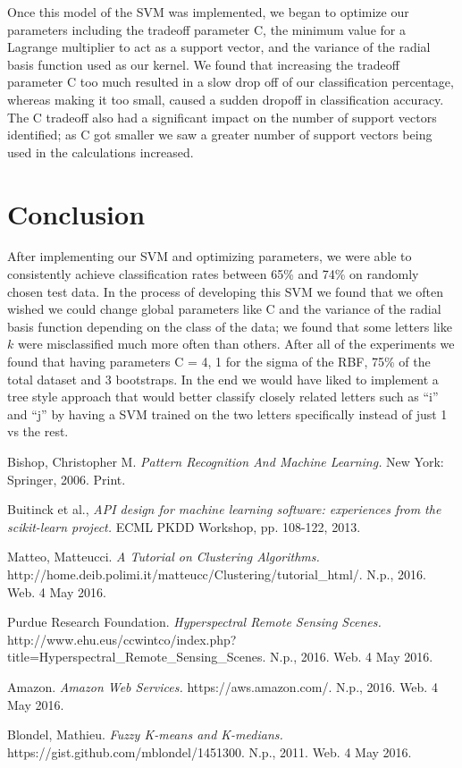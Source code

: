 \documentclass[journal]{IEEEtran}
\begin{document}
Once this model of the SVM was implemented, we began to optimize our parameters including the tradeoff parameter C, the minimum value for a Lagrange multiplier to act as a support vector, and the variance of the radial basis function used as our kernel. We found that increasing the tradeoff parameter C too much resulted in a slow drop off of our classification percentage, whereas making it too small, caused a sudden dropoff in classification accuracy. The C tradeoff also had a significant impact on the number of support vectors identified; as C got smaller we saw a greater number of support vectors being used in the calculations increased.\\

\section{Conclusion}
After implementing our SVM and optimizing parameters, we were able to consistently achieve classification rates between 65\% and 74\% on randomly chosen test data. In the process of developing this SVM we found that we often wished we could change global parameters like C and the variance of the radial basis function depending on the class of the data; we found that some letters like $k$ were misclassified much more often than others. After all of the experiments we found that having parameters C = 4, 1 for the sigma of the RBF, 75\% of the total dataset and 3 bootstraps. In the end we would have liked to implement a tree style approach that would better classify closely related letters such as “i” and “j” by having a SVM trained on the two letters specifically instead of just 1 vs the rest.


\ifCLASSOPTIONcaptionsoff
  \newpage
\fi

\begin{thebibliography}{1}

  Bishop, Christopher M. \emph{Pattern Recognition And Machine Learning.} New York: Springer, 2006. Print.

  Buitinck et al., \emph{API design for machine learning software: experiences from the scikit-learn project.} ECML PKDD Workshop, pp. 108-122, 2013.

  Matteo, Matteucci. \emph{A Tutorial on Clustering Algorithms.} http://home.deib.polimi.it/matteucc/Clustering/tutorial\_html/. N.p., 2016. Web. 4 May 2016.

  Purdue Research Foundation. \emph{Hyperspectral Remote Sensing Scenes.} http://www.ehu.eus/ccwintco/index.php?title=Hyperspectral\_Remote\_Sensing\_Scenes. N.p., 2016. Web. 4 May 2016.

  Amazon. \emph{Amazon Web Services.} https://aws.amazon.com/. N.p., 2016. Web. 4 May 2016.

  Blondel, Mathieu. \emph{Fuzzy K-means and K-medians.} https://gist.github.com/mblondel/1451300. N.p., 2011. Web. 4 May 2016.

\end{thebibliography}
\end{document}
